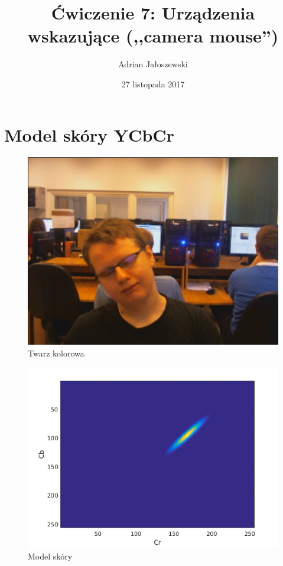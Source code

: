 \documentclass[a4paper, 12pt, titlepage]{article}
\author{Adrian Jałoszewski}
\title{Ćwiczenie 7: Urządzenia wskazujące (,,camera mouse'')}
\date{27 listopada 2017}
\begin{document}
    \maketitle
    \section{Model skóry YCbCr} 
        \begin{figure}[H]
            \centering
            \includegraphics[width=0.8\linewidth]{twarz_kolorowa.png}
            \caption{Twarz kolorowa}
        \end{figure}
        
        \begin{figure}[H]
            \centering
            \includegraphics[width=0.8\linewidth]{wizualizacja_modelu_do_sprawozdania.png}
            \caption{Model skóry}
        \end{figure}
\end{document}
